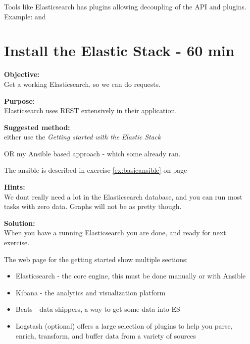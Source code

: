\documentclass[a4paper,11pt,notitlepage]{report}
\begin{document}
Tools like Elasticsearch has plugins allowing decoupling of the API and plugins. Example:  and 





\chapter{Install the Elastic Stack - 60 min}
\label{instalelastic}



{\bf Objective:}\\
Get a working Elasticsearch, so we can do requests.

{\bf Purpose:}\\
Elasticsearch uses REST extensively in their application.

{\bf Suggested method:}\\
either use the
\emph{Getting started with the Elastic Stack}

OR my Ansible based approach - which some already ran.

The ansible is described in exercise \ref{ex:basicansible} on page \pageref{ex:basicansible}

{\bf Hints:}\\
We dont really need a lot in the Elasticsearch database, and you can run most tasks with zero data. Graphs will not be as pretty though.

{\bf Solution:}\\
When you have a running Elasticsearch you are done, and ready for next exercise.

The web page for the getting started show multiple sections:
\begin{itemize}
\item Elasticsearch - the core engine, this must be done manually or with Ansible
\item Kibana - the analytics and visualization platform
\item Beats - data shippers, a way to get some data into ES
\item Logstash (optional) offers a large selection of plugins to help you parse, enrich, transform, and buffer data from a variety of sources
\end{itemize}
\end{document}
